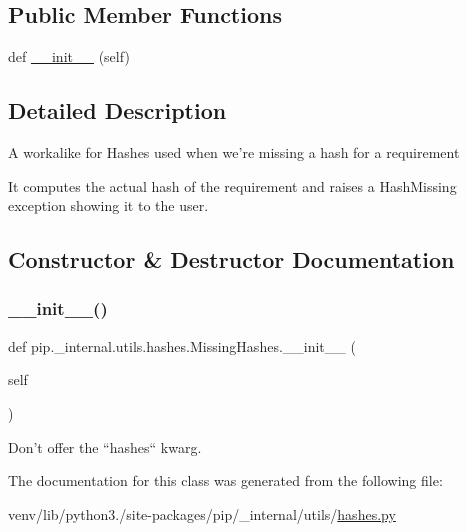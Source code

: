 \subsection*{Public Member Functions}
\begin{DoxyCompactItemize}
\item 
def \hyperlink{classpip_1_1__internal_1_1utils_1_1hashes_1_1MissingHashes_a246d4e4f54f487bed360f920d7d2dc8f}{\+\_\+\+\_\+init\+\_\+\+\_\+} (self)
\end{DoxyCompactItemize}


\subsection{Detailed Description}
\begin{DoxyVerb}A workalike for Hashes used when we're missing a hash for a requirement

It computes the actual hash of the requirement and raises a HashMissing
exception showing it to the user.\end{DoxyVerb}
 

\subsection{Constructor \& Destructor Documentation}
\mbox{\label{classpip_1_1__internal_1_1utils_1_1hashes_1_1MissingHashes_a246d4e4f54f487bed360f920d7d2dc8f}} 
\subsubsection{\texorpdfstring{\+\_\+\+\_\+init\+\_\+\+\_\+()}{\_\_init\_\_()}}
{\footnotesize\ttfamily def pip.\+\_\+internal.\+utils.\+hashes.\+Missing\+Hashes.\+\_\+\+\_\+init\+\_\+\+\_\+ (\begin{DoxyParamCaption}\item[{}]{self }\end{DoxyParamCaption})}

\begin{DoxyVerb}Don't offer the ``hashes`` kwarg.\end{DoxyVerb}
 

The documentation for this class was generated from the following file\+:\begin{DoxyCompactItemize}
\item 
venv/lib/python3./site-\/packages/pip/\+\_\+internal/utils/\hyperlink{hashes_8py}{hashes.\+py}\end{DoxyCompactItemize}
